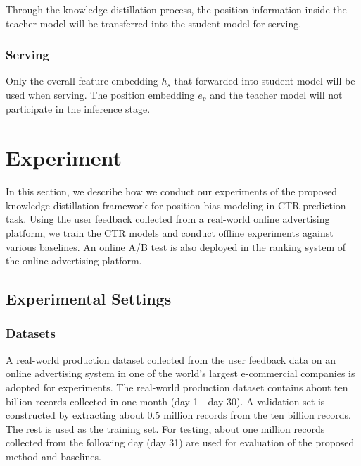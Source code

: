 \documentclass[sigconf,natbib=true,anonymous=false]{acmart}
\begin{document}


Through the knowledge distillation process, the position information inside the teacher model will be transferred into the student model for serving.
\subsubsection{Serving}
Only the overall feature embedding $h_s$ that forwarded into student model will be used when serving.
The position embedding $e_p$ and the teacher model will not participate in the inference stage.


\section{Experiment}
\label{sec:exp}
In this section, we describe how we conduct our experiments of the proposed knowledge distillation framework for position bias modeling in CTR prediction task.
Using the user feedback collected from a real-world online advertising platform, we train the CTR models and conduct offline experiments against various baselines.
An online A/B test is also deployed in the ranking system of the online advertising platform.

\subsection{Experimental Settings}
\subsubsection{Datasets}

A real-world production dataset collected from the user feedback data on an online advertising system in one of the world's largest e-commercial companies is adopted for experiments.
The real-world production dataset contains about ten billion records collected in one month (day 1 - day 30).
A validation set is constructed by extracting about 0.5 million records from the ten billion records. The rest is used as the training set.
For testing, about one million records collected from the following day (day 31) are used for evaluation of the proposed method and baselines.
\end{document}
